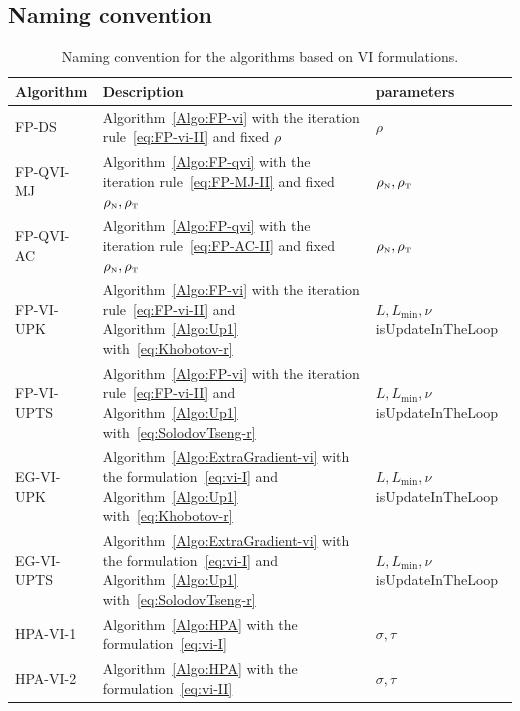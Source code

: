 \subsection{Naming convention}
\begin{table}
  \centering
  \begin{tabular}{|l|p{}|l|}
    \hline
    { Algorithm}
    & Description 
    & parameters\\
    \hline
    \sf FP-DS
    &  Algorithm~\ref{Algo:FP-vi} with the iteration rule~\eqref{eq:FP-vi-II} and fixed $\rho$
    & $\rho$ \\
    \hline
    \sf FP-QVI-MJ
    &  Algorithm~\ref{Algo:FP-qvi} with the iteration rule~\eqref{eq:FP-MJ-II} and fixed $\rho_{\hbox{\tiny{N}}},\rho_{\hbox{\tiny{T}}}$
    & $\rho_{\hbox{\tiny{N}}},\rho_{\hbox{\tiny{T}}}$\\
     \hline
    \sf FP-QVI-AC 
    &  Algorithm~\ref{Algo:FP-qvi} with the iteration rule~\eqref{eq:FP-AC-II} and fixed $\rho_{\hbox{\tiny{N}}},\rho_{\hbox{\tiny{T}}}$
    & $\rho_{\hbox{\tiny{N}}},\rho_{\hbox{\tiny{T}}}$\\
    \hline
    \sf FP-VI-UPK
    &  Algorithm~\ref{Algo:FP-vi} with the iteration rule~\eqref{eq:FP-vi-II} and Algorithm~\ref{Algo:Up1} with~\eqref{eq:Khobotov-r} 
    & $L, L_{\min}, \nu $ {\sf isUpdateInTheLoop}\\
    \hline
    \sf FP-VI-UPTS
    &  Algorithm~\ref{Algo:FP-vi} with the iteration rule~\eqref{eq:FP-vi-II} and Algorithm~\ref{Algo:Up1} with~\eqref{eq:SolodovTseng-r} 
    & $L, L_{\min}, \nu $ {\sf isUpdateInTheLoop}\\
    \hline
    \sf EG-VI-UPK
    & Algorithm~\ref{Algo:ExtraGradient-vi} with the formulation~\eqref{eq:vi-I} and Algorithm~\ref{Algo:Up1} with~\eqref{eq:Khobotov-r}
    &  $L, L_{\min}, \nu $ {\sf isUpdateInTheLoop}\\
    \hline
    \sf EG-VI-UPTS
    & Algorithm~\ref{Algo:ExtraGradient-vi} with the formulation~\eqref{eq:vi-I} and Algorithm~\ref{Algo:Up1} with~\eqref{eq:SolodovTseng-r}
    & $L, L_{\min}, \nu $ {\sf isUpdateInTheLoop}\\
    \hline
    \sf HPA-VI-1 
    & Algorithm~\ref{Algo:HPA} with the formulation~\eqref{eq:vi-I}
    & $\sigma,\tau$\\
    \hline
    \sf HPA-VI-2 
    & Algorithm~\ref{Algo:HPA} with the formulation~\eqref{eq:vi-II}
    & $\sigma,\tau$\\ 
    \hline
  \end{tabular}
  \caption{Naming convention for the algorithms based on VI formulations.}
  \label{tab:Projection-algos}
\end{table}


